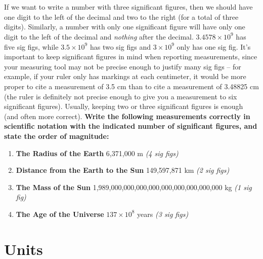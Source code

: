 \documentclass[11pt]{article}
\begin{document}
\\ \\ \noindent
If we want to write a number with three significant figures, then we should have one digit to the left of the decimal and two to the right (for a total of three digits). Similarly, a number with only one significant figure will have only one digit to the left of the decimal and \emph{nothing} after the decimal. $3.4578 \times 10^9$ has five sig figs, while $3.5 \times 10^9$ has two sig figs and $3 \times 10^9$ only has one sig fig. It's important to keep significant figures in mind when reporting measurements, since your measuring tool may not be precise enough to justify many sig figs -- for example, if your ruler only has markings at each centimeter, it would be more proper to cite a measurement of 3.5 cm than to cite a measurement of 3.48825 cm (the ruler is definitely not precise enough to give you a measurement to six significant figures). Usually, keeping two or three significant figures is enough (and often more correct). \textbf{Write the following measurements correctly in scientific notation with the indicated number of significant figures, and state the order of magnitude:}

\begin{enumerate}
    \item \textbf{The Radius of the Earth} 6,371,000 m \textit{(4 sig figs)}
    \item \textbf{Distance from the Earth to the Sun} 149,597,871 km \textit{(2 sig figs)}
    \item \textbf{The Mass of the Sun} 1,989,000,000,000,000,000,000,000,000,000 kg \textit{(1 sig fig)}
    \item \textbf{The Age of the Universe} $137 \times 10^{8}$ years \textit{(3 sig figs)}
\end{enumerate}

\section{Units}
\end{document}
